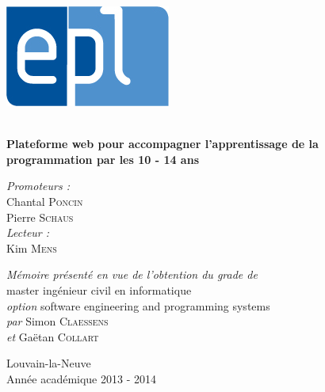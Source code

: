\begin{titlepage}
\begin{center}
\begin{minipage}{0.20\textwidth}
\includegraphics[width=\textwidth]{img/epl}
\end{minipage}

\vfill
\hrulefill 
\\[0.4cm]
{ \huge \bfseries Plateforme web pour accompagner l'apprentissage de la programmation par les 10 - 14 ans}
\\[0.1cm]
\hrulefill
\vfill
 
\begin{minipage}{0.49\textwidth}
\begin{flushleft}
\emph{Promoteurs :} \\
Chantal \textsc{Poncin} \\ 
Pierre \textsc{Schaus} \\
\emph{Lecteur :} \\
Kim \textsc{Mens} \\
\end{flushleft}
\end{minipage}
\begin{minipage}{0.5\textwidth}
\begin{flushright}
\emph{Mémoire présenté en vue de l'obtention du grade de} \\
master ingénieur civil en informatique \\
\emph{option} software engineering and programming systems \\
\emph{par} Simon \textsc{Claessens}\\
\emph{et}  Ga\"{e}tan \textsc{Collart} \\
\end{flushright}
\end{minipage}

\vfill
{\large Louvain-la-Neuve} \\
{\large Année académique 2013 - 2014} 
\end{center}
\end{titlepage}
